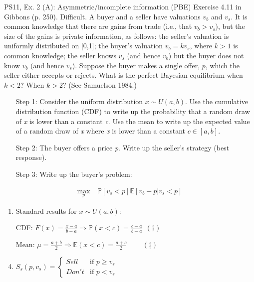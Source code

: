 \begin{frame}{PS11, Ex. 2 (A): Asymmetric/incomplete information (PBE)}
    Exercise 4.11 in Gibbons (p. 250). Difficult. A buyer and a seller have valuations $v_b$ and $v_s$. It is common knowledge that there are gains from trade (i.e., that $v_b > v_s$), but the size of the gains is private information, as follows: the seller’s valuation is uniformly distributed on [0,1]; the buyer’s valuation $v_b = kv_s$, where $k > 1$ is common knowledge; the seller knows $v_s$ (and hence $v_b$) but the buyer does not know $v_b$ (and hence $v_s$). Suppose the buyer makes a single offer, $p$, which the seller either accepts or rejects. What is the perfect Bayesian equilibrium when $k < 2$? When $k > 2$? (See Samuelson 1984.) \vspace{-8pt}
    \begin{multicols}{2}
      \begin{itemize}
        \item[Step 1:] Consider the uniform distribution $x\sim U(a, b)$. Use the cumulative distribution function (CDF) to write up the probability that a random draw of \textit{x} is lower than a constant \textit{c}. Use the mean to write up the expected value of a random draw of \textit{x} where \textit{x} is lower than a constant $c\in[a,b]$.
        \item[Step 2:] The buyer offers a price \textit{p}. Write up the seller's strategy (best response).
        \item[Step 3:] Write up the buyer's problem:
      \end{itemize} \vspace{-8pt}
      \begin{align*}
        \displaystyle{\max_p}&\ \mathbb{P}[v_s<p]\mathbb{E}[v_b-p|v_s<p]
      \end{align*}
      \vfill\null\columnbreak
      \begin{enumerate}
        \item Standard results for $x\sim U(a, b):$
        \item[CDF:] $F(x)=\frac{x-a}{b-a}\Rightarrow\mathbb{P}(x<c)=\frac{c-a}{b-a}\ \ (\dagger)$
        \item[Mean:] $\mu=\frac{a+b}{2}\Rightarrow\mathbb{E}(x<c)=\frac{a+c}{2}\quad\quad\ (\ddagger)$
        \item $S_s(p,v_s)=\left\{\begin{array}{ll}
          Sell  & \text{if }p\geq v_s \\
          Don't & \text{if }p < v_s
        \end{array}\right.$
      \end{enumerate}
      \vfill\null
    \end{multicols}
\end{frame}
